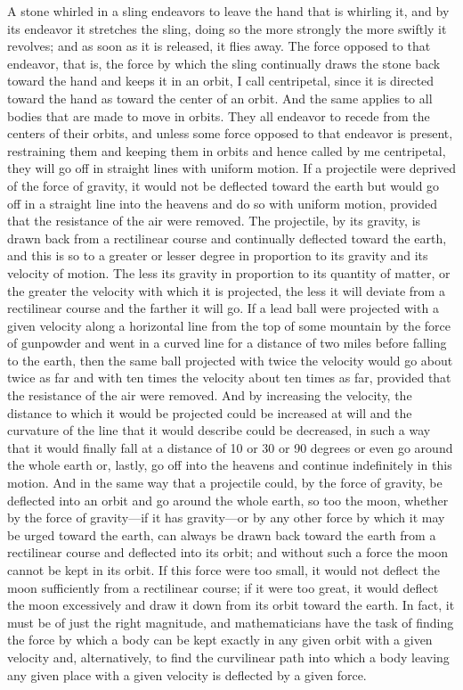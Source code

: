 \documentclass{article}
\begin{document}
\noindent A stone whirled in a sling endeavors to leave the hand that is whirling it, and by its endeavor it stretches the sling, doing so the more strongly the more swiftly it revolves; and as soon as it is released, it flies away. The force opposed to that endeavor, that is, the force by which the sling continually draws the stone back toward the hand and keeps it in an orbit, I call centripetal, since it is directed toward the hand as toward the center of an orbit. And the same applies to all bodies that are made to move in orbits. They all endeavor to recede from the centers of their orbits, and unless some force opposed to that endeavor is present, restraining them and keeping them in orbits and hence called by me centripetal, they will go off in straight lines with uniform motion. If a projectile were deprived of the force of gravity, it would not be deflected toward the earth but would go off in a straight line into the heavens and do so with uniform motion, provided that the resistance of the air were removed. The projectile, by its gravity, is drawn back from a rectilinear course and continually deflected toward the earth, and this is so to a greater or lesser degree in proportion to its gravity and its velocity of motion. The less its gravity in proportion to its quantity of matter, or the greater the velocity with which it is projected, the less it will deviate from a rectilinear course and the farther it will go. If a lead ball were projected with a given velocity along a horizontal line from the top of some mountain by the force of gunpowder and went in a curved line for a distance of two miles before falling to the earth, then the same ball projected with twice the velocity would go about twice as far and with ten times the velocity about ten times as far, provided that the resistance of the air were removed. And by increasing the velocity, the distance to which it would be projected could be increased at will and the curvature of the line that it would describe could be decreased, in such a way that it would finally fall at a distance of 10 or 30 or 90 degrees or even go around the whole earth or, lastly, go off into the heavens and continue indefinitely in this motion. And in the same way that a projectile could, by the force of gravity, be deflected into an orbit and go around the whole earth, so too the moon, whether by the force of gravity—if it has gravity—or by any other force by which it may be urged toward the earth, can always be drawn back toward the earth from a rectilinear course and deflected into its orbit; and without such a force the moon cannot be kept in its orbit. If this force were too small, it would not deflect the moon sufficiently from a rectilinear course; if it were too great, it would deflect the moon excessively and draw it down from its orbit toward the earth. In fact, it must be of just the right magnitude, and mathematicians have the task of finding the force by which a body can be kept exactly in any given orbit with a given velocity and, alternatively, to find the curvilinear path into which a body leaving any given place with a given velocity is deflected by a given force.\\
\end{document}
